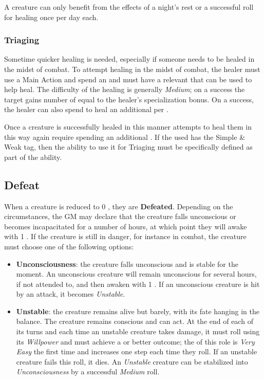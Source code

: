 A creature can only benefit from the effects of a night's rest or a successful roll for healing once per day each.

\subsubsection{Triaging}\label{sec:triage}
Sometime quicker healing is needed, especially if someone needs to be healed in the midst of combat.
To attempt healing in the midst of combat, the healer must use a Main Action and spend an \Advantage{} and must have a relevant \Specialization{} that can be used to help heal.
The difficulty of the healing is generally \emph{Medium}; on a success the target gains number of \Life{} equal to the healer's specialization bonus.
On a success, the healer can also spend \Advantage{} to heal an additional \Life{} per \Advantage{}.

Once a creature is successfully healed in this manner attempts to heal them in this way again require spending an additional \Advantage.
If the \Specialization{} used has the Simple \& Weak tag, then the ability to use it for Triaging must be specifically defined as part of the ability.

\subsection{Defeat}
When a creature is reduced to 0 \Life{}, they are \textbf{Defeated}.
Depending on the circumstances, the GM may declare that the creature falls unconscious or becomes incapacitated for a number of hours, at which point they will awake with 1 \Life{}.
If the creature is still in danger, for instance in combat, the creature must choose one of the following options:
\begin{itemize}
  \item[-] \textbf{Unconsciousness}: the creature falls unconscious and is stable for the moment.
    An unconscious creature will remain unconscious for several hours, if not attended to, and then awaken with 1 \Life{}.
    If an unconscious creature is hit by an attack, it becomes \emph{Unstable}.
  \item[-] \textbf{Unstable}: the creature remains alive but barely, with its fate hanging in the balance.
    The creature remains conscious and can act.
    At the end of each of its turns and each time an unstable creature takes damage, it must roll using its \emph{Willpower} \Attribute{} and must achieve a \Mixed{} or better outcome; the \Difficulty{} of this role is \emph{Very Easy} the first time and increases one step each time they roll.
    If an unstable creature fails this roll, it dies.
    An \emph{Unstable} creature can be stabilized into \emph{Unconsciousness} by a successful \emph{Medium} \Difficulty{} roll.
\end{itemize}

